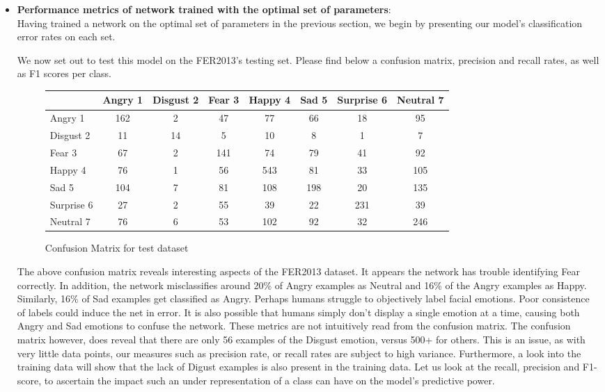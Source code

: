 \begin{itemize}[topsep=-10pt]
  
\item \textbf{Performance metrics of network trained with the optimal set of parameters}:\\
  Having trained a network on the optimal set of parameters in the previous section,
  we begin by presenting our model's classification error rates on each set.
  
  We now set out to test this model on the FER2013's testing set.
  Please find below a confusion matrix, precision and recall rates, as well as F1 scores per class.
  \begin{figure}[h]
  \begin{center}
    \caption{Confusion Matrix for test dataset}
    \begin{tabular}{ | l || c | c | c | c | c | c | c |}
    \hline
          & Angry 1 & Disgust 2 & Fear 3 & Happy 4 & Sad 5 & Surprise 6 & Neutral 7 \\ \hline \hline
        Angry 1 & 162 & 2 & 47 & 77 & 66 & 18 & 95 \\ \hline
        Disgust 2 & 11 & 14 & 5 & 10 & 8 & 1 & 7 \\ \hline
        Fear 3 & 67 & 2 & 141 & 74 & 79 & 41 & 92 \\ \hline
        Happy 4 & 76 & 1 & 56 & 543 & 81 & 33 & 105 \\ \hline
        Sad 5 & 104 & 7 & 81 & 108 & 198 & 20 & 135 \\ \hline
        Surprise 6 & 27 & 2 & 55 & 39 & 22 & 231 & 39 \\ \hline
        Neutral 7 & 76 & 6 & 53 & 102 & 92 & 32 & 246 \\ \hline
    \end{tabular}
    \label{fig:confusionMatrix}
\end{center}
\end{figure}

  The above confusion matrix reveals interesting aspects of the FER2013 dataset.
  It appears the network has trouble identifying Fear correctly.
  In addition, the network misclassifies around 20\% of Angry examples as Neutral and 16\% of the Angry examples as Happy.
  Similarly, 16\% of Sad examples get classified as Angry.
  Perhaps humans struggle to objectively label facial emotions.
  Poor consistence of labels could induce the net in error.
  It is also possible that humans simply don't display a single emotion at a time,
  causing both Angry and Sad emotions to confuse the network.
  These metrics are not intuitively read from the confusion matrix.
  The confusion matrix however, does reveal that there are only 56 examples of the Disgust emotion, versus 500+ for others.
  This is an issue, as with very little data points, our measures such as precision rate, or recall rates are subject to high variance.
  Furthermore, a look into the training data will show that the lack of Digust examples is also present in the training data.
  Let us look at the recall, precision and F1-score,
  to ascertain the impact such an under representation of a class can have on the model's predictive power.
  

\end{itemize}
